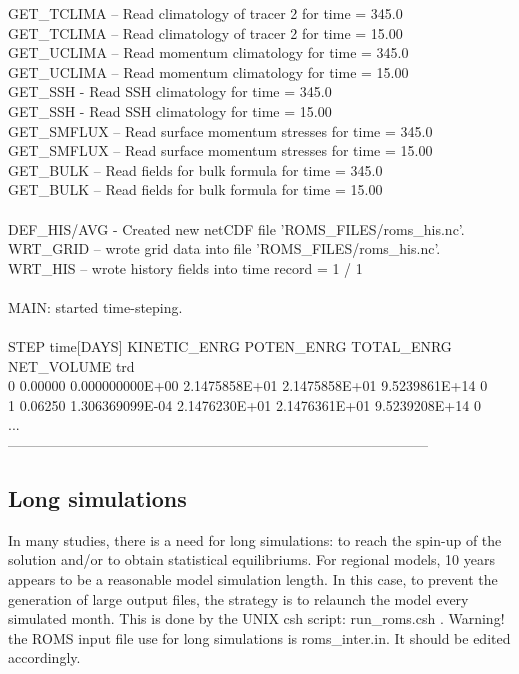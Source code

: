 GET\_TCLIMA -- Read climatology of tracer   2 for time =    345.0 \\
GET\_TCLIMA -- Read climatology of tracer   2 for time =    15.00 \\
GET\_UCLIMA -- Read momentum climatology      for time =    345.0 \\
GET\_UCLIMA -- Read momentum climatology      for time =    15.00 \\
GET\_SSH     - Read SSH climatology           for time =    345.0 \\
GET\_SSH     - Read SSH climatology           for time =    15.00 \\
GET\_SMFLUX -- Read surface momentum stresses for time =    345.0 \\
GET\_SMFLUX -- Read surface momentum stresses for time =    15.00 \\
GET\_BULK   -- Read fields for bulk formula   for time =    345.0 \\
GET\_BULK   -- Read fields for bulk formula   for time =    15.00 \\
\\
DEF\_HIS/AVG - Created new netCDF file 'ROMS\_FILES/roms\_his.nc'.\\
WRT\_GRID -- wrote grid data into file 'ROMS\_FILES/roms\_his.nc'.\\
WRT\_HIS -- wrote history fields into time record =   1 /   1\\
\\
MAIN: started time-steping.\\
\\
STEP   time[DAYS] KINETIC\_ENRG    POTEN\_ENRG    TOTAL\_ENRG    NET\_VOLUME   trd\\
0     0.00000 0.000000000E+00 2.1475858E+01 2.1475858E+01 9.5239861E+14  0\\
1     0.06250 1.306369099E-04 2.1476230E+01 2.1476361E+01 9.5239208E+14  0\\
...\\
------------------------------------------------------------------------------------------\\

\subsection{Long simulations}

In many studies, there is a need for long simulations: to reach the spin-up of 
the solution and/or to obtain statistical equilibriums.
For regional models, 10 years appears to be a reasonable model simulation length.
In this case, to prevent the generation of large output files, the strategy 
is to relaunch the model every simulated month.
This is done by the UNIX csh script: run\_roms.csh .
Warning! the ROMS input file use for long simulations is roms\_inter.in.
It should be edited accordingly.


